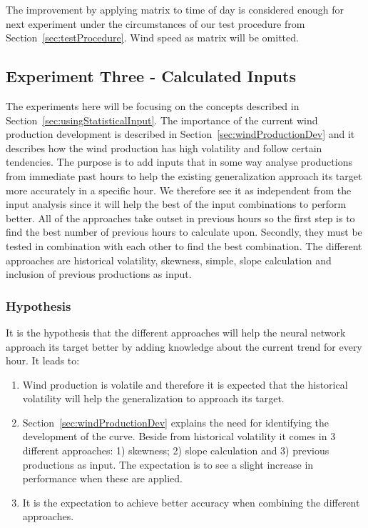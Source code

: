 The improvement by applying matrix to time of day is considered enough for next experiment under the circumstances of our test procedure from Section~\ref{sec:testProcedure}. Wind speed as matrix will be omitted.

\newpage

\subsection{Experiment Three - Calculated Inputs}
The experiments here will be focusing on the concepts described in Section~\ref{sec:usingStatisticalInput}. The importance of the current wind production development is described in Section~\ref{sec:windProductionDev} and it describes how the wind production has high volatility and follow certain tendencies. The purpose is to add inputs that in some way analyse productions from immediate past hours to help the existing generalization approach its target more accurately in a specific hour. We therefore see it as independent from the input analysis since it will help the best of the input combinations to perform better. All of the approaches take outset in previous hours so the first step is to find the best number of previous hours to calculate upon. Secondly, they must be tested in combination with each other to find the best combination. The different approaches are historical volatility, skewness, simple, slope calculation and inclusion of previous productions as input. 

\subsubsection{Hypothesis} 
It is the hypothesis that the different approaches will help the neural network approach its target better by adding knowledge about the current trend for every hour. It leads to: 

\begin{enumerate}
\item Wind production is volatile and therefore it is expected that the historical volatility will help the generalization to approach its target.
\item Section~\ref{sec:windProductionDev} explains the need for identifying the development of the curve. Beside from historical volatility it comes in 3 different approaches: 1) skewness; 2) slope calculation and 3) previous productions as input. The expectation is to see a slight increase in performance when these are applied.
\item It is the expectation to achieve better accuracy when combining the different approaches.
\end{enumerate}

